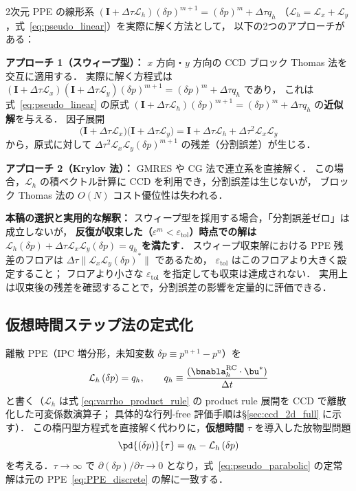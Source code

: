 \label{warn:ppe_splitting}
\begin{tcolorbox}[warnbox, title={2次元求解における実装方法と分割誤差について}]
2次元 PPE の線形系 $(\mathbf{I} + \Delta\tau\mathcal{L}_h)(\delta p)^{m+1} = (\delta p)^m + \Delta\tau q_h$
（$\mathcal{L}_h = \mathcal{L}_x + \mathcal{L}_y$，式~\eqref{eq:pseudo_linear}）を実際に解く方法として，
以下の2つのアプローチがある：

\textbf{アプローチ 1（スウィープ型）：} $x$ 方向・$y$ 方向の CCD ブロック Thomas 法を交互に適用する．
実際に解く方程式は $(\mathbf{I}+\Delta\tau\mathcal{L}_x)(\mathbf{I}+\Delta\tau\mathcal{L}_y)(\delta p)^{m+1} = (\delta p)^m + \Delta\tau q_h$ であり，
これは式~\eqref{eq:pseudo_linear} の原式 $(\mathbf{I}+\Delta\tau\mathcal{L}_h)(\delta p)^{m+1} = (\delta p)^m + \Delta\tau q_h$ の\textbf{近似解}を与える．
因子展開
\[
  \bigl(\mathbf{I}+\Delta\tau\mathcal{L}_x\bigr)\bigl(\mathbf{I}+\Delta\tau\mathcal{L}_y\bigr)
  = \mathbf{I} + \Delta\tau\mathcal{L}_h + \Delta\tau^2\mathcal{L}_x\mathcal{L}_y
\]
から，原式に対して $\Delta\tau^2\mathcal{L}_x\mathcal{L}_y(\delta p)^{m+1}$ の残差（分割誤差）が生じる．

\textbf{アプローチ 2（Krylov 法）：} GMRES や CG 法で連立系を直接解く．
この場合，$\mathcal{L}_h$ の積ベクトル計算に CCD を利用でき，分割誤差は生じないが，
ブロック Thomas 法の $O(N)$ コスト優位性は失われる．

\textbf{本稿の選択と実用的な解釈：}
スウィープ型を採用する場合，「分割誤差ゼロ」は成立しないが，
\textbf{反復が収束した（$\varepsilon^m < \varepsilon_\text{tol}$）時点での解は $\mathcal{L}_h(\delta p) + \Delta\tau\mathcal{L}_x\mathcal{L}_y(\delta p) = q_h$ を満たす}．
スウィープ収束解における PPE 残差のフロアは $\Delta\tau\|\mathcal{L}_x\mathcal{L}_y(\delta p)^*\|$ であるため，
$\varepsilon_\text{tol}$ はこのフロアより大きく設定すること；
フロアより小さな $\varepsilon_\text{tol}$ を指定しても収束は達成されない．
実用上は収束後の残差を確認することで，分割誤差の影響を定量的に評価できる．
\end{tcolorbox}

\subsection{仮想時間ステップ法の定式化}
\label{sec:pseudo_formulation}

離散 PPE（IPC 増分形，未知変数 $\delta p \equiv p^{n+1}-p^n$）を
\begin{equation}
  \mathcal{L}_h\,(\delta p) = q_h,
  \qquad
  q_h \equiv \frac{(\bnabla_h^{\mathrm{RC}}\cdot\bu^*)}{\Delta t}
  \label{eq:PPE_discrete}
\end{equation}
と書く（$\mathcal{L}_h$ は式 \eqref{eq:varrho_product_rule} の product rule 展開を CCD で離散化した可変係数演算子；
具体的な行列-free 評価手順は§\ref{sec:ccd_2d_full} に示す）．
この楕円型方程式を直接解く代わりに，\textbf{仮想時間} $\tau$ を導入した放物型問題
\begin{equation}
  \pd{(\delta p)}{\tau} = q_h - \mathcal{L}_h\,(\delta p)
  \label{eq:pseudo_parabolic}
\end{equation}
を考える．$\tau\to\infty$ で $\partial(\delta p)/\partial\tau \to 0$ となり，式~\eqref{eq:pseudo_parabolic} の定常解は元の PPE~\eqref{eq:PPE_discrete} の解に一致する．

